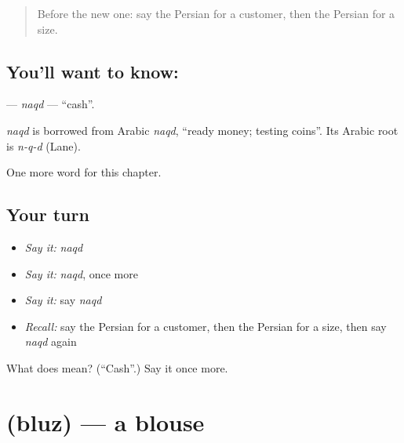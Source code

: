 \label{lesson:FA-C166-naqd}



\begin{quote}
Before the new one: say the Persian for a customer, then the Persian for a size.
\end{quote}

\subsection*{You'll want to know: }
\textbf{} — \emph{naqd} — \textquotedblleft{}cash\textquotedblright{}.

\begin{cousinweb}
\emph{naqd} is borrowed from Arabic \emph{naqd}, \textquotedblleft{}ready money; testing coins\textquotedblright{}. Its Arabic root is \emph{n-q-d} (Lane).
\end{cousinweb}

\begin{grammarlens}[title={What you've built}]
One more word for this chapter.
\end{grammarlens}

\subsection*{Your turn}
\begin{itemize}
\raggedright
  \item \emph{Say it:} \emph{naqd}
  \item \emph{Say it:} \emph{naqd}, once more
  \item \emph{Say it:} say \emph{naqd}
  \item \emph{Recall:} say the Persian for a customer, then the Persian for a size, then say \emph{naqd} again
\end{itemize}

\begin{tcolorbox}[breakable,colback=teal!4,colframe=teal!35!black,title={Before you move on}]
What does  mean? (\textquotedblleft{}Cash\textquotedblright{}.) Say it once more.
\end{tcolorbox}
\section[\texorpdfstring{\fa{بلوز} (bluz)}{بلوز (bluz)}]{ (bluz) — a blouse}

\label{lesson:FA-C166-bluz}



